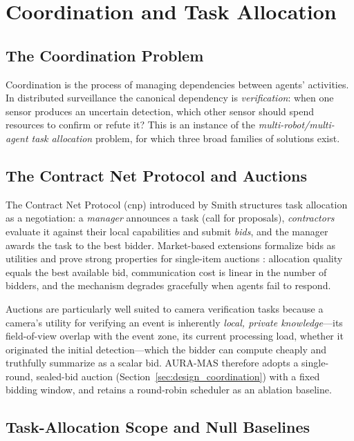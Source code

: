 \section{Coordination and Task Allocation}

\subsection{The Coordination Problem}

Coordination is the process of managing dependencies between agents' activities. In distributed surveillance the canonical dependency is \emph{verification}: when one sensor produces an uncertain detection, which other sensor should spend resources to confirm or refute it? This is an instance of the \emph{multi-robot/multi-agent task allocation} problem, for which three broad families of solutions exist.

\subsection{The Contract Net Protocol and Auctions}

The Contract Net Protocol (\gls{cnp}) introduced by Smith \cite{smith1980contract} structures task allocation as a negotiation: a \emph{manager} announces a task (call for proposals), \emph{contractors} evaluate it against their local capabilities and submit \emph{bids}, and the manager awards the task to the best bidder. Market-based extensions formalize bids as utilities and prove strong properties for single-item auctions \cite{parker2002alliance}: allocation quality equals the best available bid, communication cost is linear in the number of bidders, and the mechanism degrades gracefully when agents fail to respond.

Auctions are particularly well suited to camera verification tasks because a camera's utility for verifying an event is inherently \emph{local, private knowledge}---its field-of-view overlap with the event zone, its current processing load, whether it originated the initial detection---which the bidder can compute cheaply and truthfully summarize as a scalar bid. AURA-MAS therefore adopts a single-round, sealed-bid auction (Section~\ref{sec:design_coordination}) with a fixed bidding window, and retains a round-robin scheduler as an ablation baseline.

\subsection{Task-Allocation Scope and Null Baselines}

